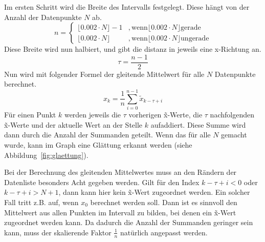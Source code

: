 Im ersten Schritt wird die Breite des Intervalls festgelegt.
Diese hängt von der Anzahl der Datenpunkte $N$ ab.
\[
    n =
    \begin{cases}
        \lfloor0.002 \cdot N \rfloor - 1 & , \text{wenn} \lfloor0.002 \cdot N \rfloor \text{gerade} \\
        \lfloor0.002 \cdot N \rfloor     & , \text{wenn} \lfloor0.002 \cdot N \rfloor \text{ungerade}
    \end{cases}
\]
Diese Breite wird nun halbiert, und gibt die distanz in jeweils eine x-Richtung an.
\[
    \tau = \frac{n - 1}{2}
\]
Nun wird mit folgender Formel der gleitende Mittelwert für alle $N$ Datenpunkte berechnet.
\[
    x_k = \frac{1}{n} \sum_{i = 0}^{n - 1} \tilde{x}_{k-\tau+i}
\]
Für einen Punkt $k$ werden jeweils die $\tau$ vorherigen \~x-Werte, die $\tau$ nachfolgenden \~x-Werte und der aktuelle Wert an der Stelle $k$ aufaddiert.
Diese Summe wird dann durch die Anzahl der Summanden geteilt.
Wenn das für alle $N$ gemacht wurde, kann im Graph eine Glättung erkannt werden (siehe Abbildung~\ref{fig:glaettung}).

Bei der Berechnung des gleitenden Mittelwertes muss an den Rändern der Datenliste besonders Acht gegeben werden.
Gilt für den Index $k-\tau+i < 0$ oder $k-\tau+i > N + 1$, dann kann hier kein \~x-Wert zugeordnet werden.
Ein solcher Fall tritt z.B. auf, wenn $x_0$ berechnet werden soll.
Dann ist es sinnvoll den Mittelwert aus allen Punkten im Intervall zu bilden, bei denen ein \~x-Wert zugeordnet werden kann.
Da dadurch die Anzahl der Summanden geringer sein kann, muss der skalierende Faktor $\frac{1}{n}$ natürlich angepasst werden.



